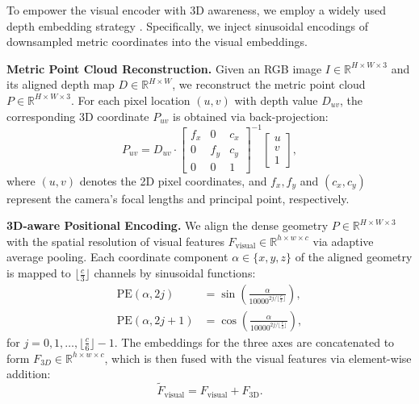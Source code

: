 To empower the visual encoder with 3D awareness, we employ a widely used depth embedding strategy \cite{zheng2025video, wang2025n3d}. Specifically, we inject sinusoidal encodings of downsampled metric coordinates into the visual embeddings.

\textbf{Metric Point Cloud Reconstruction.}
Given an RGB image $I \in \mathbb{R}^{H \times W \times 3}$ and its aligned depth map $D \in \mathbb{R}^{H \times W}$, we reconstruct the metric point cloud $P \in \mathbb{R}^{H \times W \times 3}$. For each pixel location $(u, v)$ with depth value $D_{uv}$, the corresponding 3D coordinate $P_{uv}$ is obtained via back-projection:
\begin{equation}
    P_{uv} =  D_{uv} \cdot \begin{bmatrix} f_x & 0 & c_x \\ 0 & f_y & c_y \\ 0 & 0 & 1 \end{bmatrix}^{-1} \begin{bmatrix} u \\ v \\ 1 \end{bmatrix},
\end{equation}
where $(u, v)$ denotes the 2D pixel coordinates, and $f_x, f_y$ and $(c_x, c_y)$ represent the camera's focal lengths and principal point, respectively.

\textbf{3D-aware Positional Encoding.}
We align the dense geometry $P \in \mathbb{R}^{H \times W \times 3}$ with the spatial resolution of visual features $F_\text{visual} \in \mathbb{R}^{h \times w \times c}$ via adaptive average pooling. Each coordinate component $\alpha \in \{x, y, z\}$ of the aligned geometry is mapped to $\lfloor \frac{c}{3} \rfloor$ channels by sinusoidal functions:
\begin{equation}
    \begin{aligned}
        \text{PE}(\alpha, 2j) &= \sin\left( \frac{\alpha}{10000^{2j / \lfloor \frac{c}{3} \rfloor}} \right), \\
        \text{PE}(\alpha, 2j+1) &= \cos\left( \frac{\alpha}{10000^{2j / \lfloor \frac{c}{3} \rfloor}} \right),
    \end{aligned}
\end{equation}
for $j = 0, 1, \dots, \lfloor \frac{c}{6} \rfloor - 1$. The embeddings for the three axes are concatenated to form $F_{3D} \in \mathbb{R}^{h \times w \times c}$, which is then fused with the visual features via element-wise addition:
\begin{equation}
    \tilde{F}_\text{visual} = F_\text{visual} + F_\text{3D}.
\end{equation}

